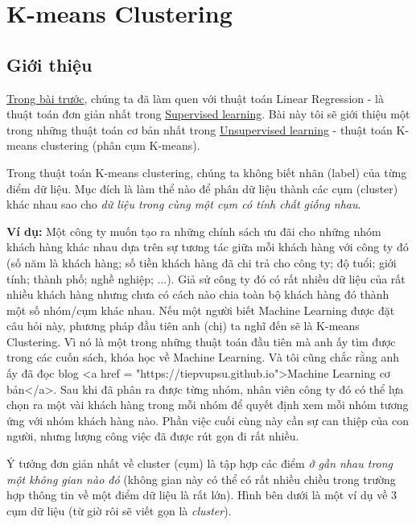 \chapter{K-means Clustering}
\section{Giới thiệu}
\href{http://machinelearningcoban.com/2016/12/28/linearregression/}{Trong bài trước}, chúng ta đã làm quen với thuật toán Linear Regression - là thuật toán đơn giản nhất trong \href{http://machinelearningcoban.com/2016/12/27/categories/#supervised-learning-hoc-co-giam-sat}{Supervised learning}. Bài này tôi sẽ giới thiệu một trong những thuật toán cơ bản nhất trong \href{http://machinelearningcoban.com/2016/12/27/categories/#unsupervised-learning-hoc-khong-giam-sat}{Unsupervised learning} - thuật toán K-means clustering (phân cụm K-means).  
 
  
 
Trong thuật toán K-means clustering, chúng ta không biết nhãn (label) của từng điểm dữ liệu. Mục đích là làm thể nào để phân dữ liệu thành các cụm (cluster) khác nhau sao cho \textit{dữ liệu trong cùng một cụm có tính chất giống nhau}.  
 
\textbf{Ví dụ:} Một công ty muốn tạo ra những chính sách ưu đãi cho những nhóm khách hàng khác nhau dựa trên sự tương tác giữa mỗi khách hàng với công ty đó (số năm là khách hàng; số tiền khách hàng đã chi trả cho công ty; độ tuổi; giới tính; thành phố; nghề nghiệp; ...). Giả sử công ty đó có rất nhiều dữ liệu của rất nhiều khách hàng nhưng chưa có cách nào chia toàn bộ khách hàng đó thành một số nhóm/cụm khác nhau. Nếu một người biết Machine Learning được đặt câu hỏi này, phương pháp đầu tiên anh (chị) ta nghĩ đến sẽ là K-means Clustering. Vì nó là một trong những thuật toán đầu tiên mà anh ấy tìm được trong các cuốn sách, khóa học về Machine Learning. Và tôi cũng chắc rằng anh ấy đã đọc blog <a href = "https://tiepvupsu.github.io">Machine Learning cơ bản</a>. Sau khi đã phân ra được từng nhóm, nhân viên công ty đó có thể lựa chọn ra một vài khách hàng trong mỗi nhóm để quyết định xem mỗi nhóm tương ứng với nhóm khách hàng nào. Phần việc cuối cùng này cần sự can thiệp của con người, nhưng lượng công việc đã được rút gọn đi rất nhiều.  
 
Ý tưởng đơn giản nhất về cluster (cụm) là tập hợp các điểm \textit{ở gần nhau trong một không gian nào đó} (không gian này có thể có rất nhiều chiều trong trường hợp thông tin về một điểm dữ liệu là rất lớn). Hình bên dưới là một ví dụ về 3 cụm dữ liệu (từ giờ rôi sẽ viết gọn là \textit{cluster}).  
 
